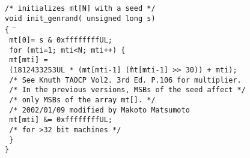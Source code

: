 \documentclass[12pt]{article}
\numberwithin{equation}{section}
\numberwithin{table}{section}
\begin{document}
\begin{tabbing}
\texttt{/* initializes mt[N] with a seed */}\\
\texttt{void init\_genrand( unsigned long s) }\\
\texttt{\{} \ \= \+ \\
\texttt{ mt[0]= s \& 0xffffffffUL;}  \\
\texttt{    for}\=\texttt{ (mti=1; mti<N; mti++) \{ }\+\\
\texttt{        mt[mti] = }\\
\texttt{	    (1812433253UL * (mt[mti-1] \^ (mt[mti-1] >> 30)) + mti); }\\
\texttt{        /* See Knuth TAOCP Vol2. 3rd Ed. P.106 for multiplier.}\\ %
\texttt{       /* In the previous versions, MSBs of the seed affect  */}\\
\texttt{        /* only MSBs of the array mt[].                        */}\\
\texttt{        /* 2002/01/09 modified by Makoto Matsumoto            }\\ %
\texttt{       mt[mti] \&= 0xffffffffUL;}\\
\- \texttt{       /* for >32 bit machines */}\\
\- \texttt{    \}}\\
\texttt{\}}
\end{tabbing}
\end{document}
